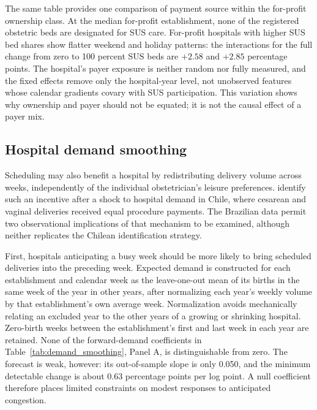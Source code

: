 The same table provides one comparison of payment source within the for-profit
ownership class. At the median for-profit establishment, none of the registered
obstetric beds are designated for SUS care. For-profit hospitals with higher SUS
bed shares show flatter weekend and holiday patterns: the interactions for the full
change from zero to 100 percent SUS beds are $+2.58$ and $+2.85$ percentage points.
The hospital's payer exposure is neither random nor fully measured, and the fixed
effects remove only the hospital-year level, not unobserved features whose calendar
gradients covary with SUS participation. This variation shows why ownership and
payer should not be equated; it is not the causal effect of a payer mix.



\subsection{Hospital demand smoothing}\label{app:smoothing}

Scheduling may also benefit a hospital by redistributing delivery volume across
weeks, independently of the individual obstetrician's leisure preferences.
\citet{elejalde2021} identify such an incentive after a shock to hospital demand
in Chile, where cesarean and vaginal deliveries received equal procedure payments.
The Brazilian data permit two observational implications of that mechanism to be
examined, although neither replicates the Chilean identification strategy.

First, hospitals anticipating a busy week should be more likely to bring scheduled
deliveries into the preceding week. Expected demand is constructed for each
establishment and calendar week as the leave-one-out mean of its births in the same
week of the year in other years, after normalizing each year's weekly volume by
that establishment's own average week. Normalization avoids mechanically relating
an excluded year to the other years of a growing or shrinking hospital. Zero-birth
weeks between the establishment's first and last week in each year are retained.
None of the forward-demand coefficients in Table~\ref{tab:demand_smoothing},
Panel A, is distinguishable from zero. The forecast is weak, however: its
out-of-sample slope is only 0.050, and the minimum detectable change is about 0.63
percentage points per log point. A null coefficient therefore places limited
constraints on modest responses to anticipated congestion.

